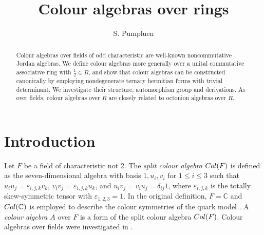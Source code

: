 \documentclass[10pt]{amsart}
\theoremstyle{plain}
\theoremstyle{definition}
\begin{document}
\setlength{\parindent}{0pt}






\author{S. Pumpluen}
\address{School of Mathematical Sciences\\
University of Nottingham\\
University Park\\
Nottingham NG7 2RD\\
United Kingdom
}






\title{Colour algebras over rings}


\begin{abstract}  
Colour algebras over fields of odd characteristic are well-known noncommutative Jordan algebras.
We define colour algebras more generally over a unital commutative associative ring with $\frac{1}{2}\in R$, and show that colour algebras can be constructed canonically by employing nondegenerate ternary hermitian forms with trivial determinant. We investigate their structure, automorphism group and derivations.
As over fields, colour algebras over $R$ are closely related to octonion algebras over $R$.
\end{abstract}

\maketitle


\section*{Introduction}

Let $F$ be a field of characteristic not 2.
The \emph{split colour algebra} ${\rm Col}(F)$ is defined as the seven-dimensional algebra with basis $1,u_i,v_i$ for $1\leq i\leq 3$ such that $u_iu_j=\varepsilon_{i,j,k}v_k$, $v_iv_j=\varepsilon_{i,j,k}u_k$, and $u_iv_j=v_iu_j=\delta_{ij}1$, where $\varepsilon_{i,j,k}$ is the totally skew-symmetric tensor with $\varepsilon_{1,2,3}=1$. In the original definition, $F=\mathbb{C}$  and ${\rm Col}(\mathbb{C})$ is employed to describe the colour symmetries of the quark model \cite{DKD}.
A \emph{colour algebra} $A$ over $F$ is a form of the split colour algebra ${\rm Col}(F)$. Colour algebras over fields  were investigated  in \cite{E1, EM, E, Sch1, Sch2}.
\end{document}
